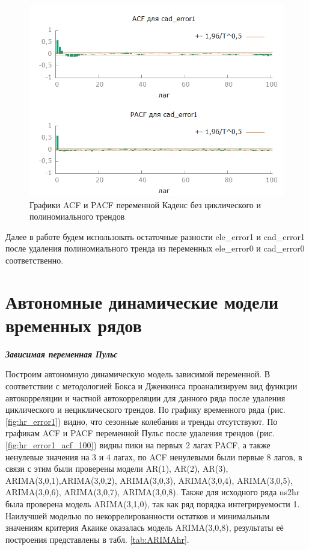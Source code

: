 \documentclass[a4paper,12pt]{article}
\begin{document}
\begin{figure}[H]
	\centering
	\includegraphics[width=0.5\linewidth]{../[graphics]/cad_error1_acf_100.png}
	\caption{Графики ACF и PACF переменной Каденс без циклического и полиномиального трендов}
	\label{fig:cad_error1_acf_100}
\end{figure}

Далее в работе будем использовать остаточные разности ele\_error1 и cad\_error1 после удаления полиномиального тренда из переменных ele\_error0 и cad\_error0 соответственно.

\section{Автономные динамические модели временных рядов}

\textbf{\textit{Зависимая переменная Пульс}}
		
Построим автономную динамическую модель зависимой переменной. В соответствии с методологией Бокса и Дженкинса проанализируем вид функции автокорреляции и частной автокорреляции для данного ряда после удаления циклического и нециклического трендов. По графику временного ряда (рис. \ref{fig:hr_error1}) видно, что сезонные колебания и тренды отсутствуют. По графикам ACF и PACF переменной Пульс после удаления трендов (рис. \ref{fig:hr_error1_acf_100}) видны пики на первых 2 лагах PACF, а также ненулевые значения на 3 и 4 лагах, по ACF ненулевыми были первые 8 лагов, в связи с этим были проверены модели AR(1), AR(2), AR(3), ARIMA(3,0,1),ARIMA(3,0,2), ARIMA(3,0,3), ARIMA(3,0,4), ARIMA(3,0,5), ARIMA(3,0,6), ARIMA(3,0,7), ARIMA(3,0,8). Также для исходного ряда ns2hr была проверена модель ARIMA(3,1,0), так как ряд порядка интегрируемости 1. Наилучшей моделью по некоррелированности остатков и минимальным значениям критерия Акаике оказалась модель ARIMA(3,0,8), результаты её построения представлены в табл. \ref{tab:ARIMAhr}.
\end{document}
